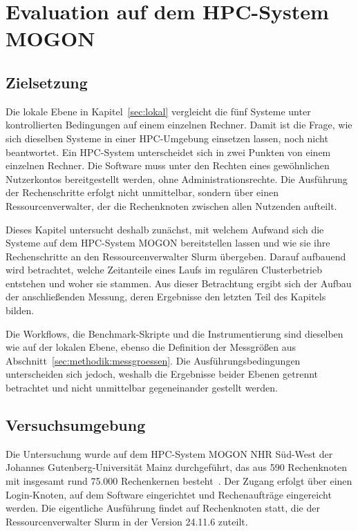 
\lstset{breaklines=true, breakatwhitespace=false}

\chapter{Evaluation auf dem HPC-System MOGON}
\label{sec:mogon}
\section{Zielsetzung}
\label{sec:mogon:ziel}

Die lokale Ebene in Kapitel~\ref{sec:lokal} vergleicht die fünf
Systeme unter kontrollierten Bedingungen auf einem einzelnen
Rechner. Damit ist die Frage, wie sich dieselben Systeme in einer
HPC-Umgebung einsetzen lassen, noch nicht beantwortet. Ein
HPC-System unterscheidet sich in zwei Punkten von einem einzelnen
Rechner. Die Software muss unter den Rechten eines gewöhnlichen
Nutzerkontos bereitgestellt werden, ohne Administrationsrechte.
Die Ausführung der Rechenschritte erfolgt nicht unmittelbar,
sondern über einen Ressourcenverwalter, der die Rechenknoten
zwischen allen Nutzenden aufteilt.

Dieses Kapitel untersucht deshalb zunächst, mit welchem Aufwand
sich die Systeme auf dem HPC-System MOGON bereitstellen lassen und
wie sie ihre Rechenschritte an den Ressourcenverwalter Slurm
übergeben. Darauf aufbauend wird betrachtet, welche Zeitanteile
eines Laufs im regulären Clusterbetrieb entstehen und woher sie
stammen. Aus dieser Betrachtung ergibt sich der Aufbau der
anschließenden Messung, deren Ergebnisse den letzten Teil des
Kapitels bilden.

Die Workflows, die Benchmark-Skripte und die Instrumentierung sind
dieselben wie auf der lokalen Ebene, ebenso die Definition der
Messgrößen aus Abschnitt~\ref{sec:methodik:messgroessen}. Die
Ausführungsbedingungen unterscheiden sich jedoch, weshalb die
Ergebnisse beider Ebenen getrennt betrachtet und nicht unmittelbar
gegeneinander gestellt werden.


\section{Versuchsumgebung}
\label{sec:mogon:umgebung}

Die Untersuchung wurde auf dem HPC-System MOGON NHR Süd-West der
Johannes Gutenberg-Universität Mainz durchgeführt, das aus 590
Rechenknoten mit insgesamt rund 75.000 Rechenkernen
besteht~\cite{mogonnhr}. Der Zugang erfolgt über einen
Login-Knoten, auf dem Software eingerichtet und Rechenaufträge
eingereicht werden. Die eigentliche Ausführung findet auf
Rechenknoten statt, die der Ressourcenverwalter Slurm in der
Version 24.11.6 zuteilt.

